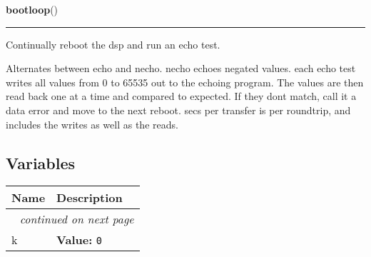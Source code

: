     \label{loopback:bootloop}

    \vspace{0.5ex}

    \begin{boxedminipage}{\textwidth}

    \raggedright \textbf{bootloop}()

    \vspace{-1.5ex}

    \rule{\textwidth}{0.5\fboxrule}
    Continually reboot the dsp and run an echo test.

    Alternates between echo and necho. necho echoes negated values. each 
    echo test writes all values from 0 to 65535 out to the echoing program.
    The values are then read back one at a time and compared to expected. 
    If they dont match, call it a data error and move to the next reboot. 
    secs per transfer is per roundtrip, and includes the writes as well as 
    the reads.

    \vspace{1ex}

    \end{boxedminipage}



  \subsection{Variables}

\begin{longtable}{|p{}|p{}|l}
\cline{1-2}
\cline{1-2} \centering \textbf{Name} & \centering \textbf{Description}& \\
\cline{1-2}
\endhead\cline{1-2}\multicolumn{3}{r}{\small\textit{continued on next page}}\\\endfoot\cline{1-2}
\endlastfoot\raggedright k\- & \textbf{Value:} 
{\tt 0\-}&\\
\cline{1-2}
\end{longtable}

